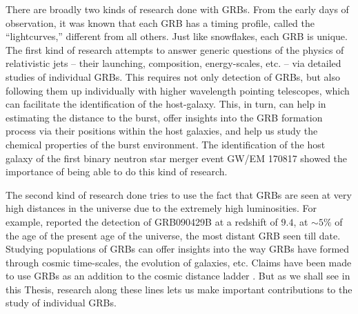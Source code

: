 There are broadly two kinds of research done with GRBs. From the early days of observation, it was known that each GRB has a timing profile, called the ``lightcurves,'' different from all others. Just like snowflakes, each GRB is unique. The first kind of research attempts to answer generic questions of the physics of relativistic jets -- their launching, composition, energy-scales, etc. -- via detailed studies of individual GRBs. This requires not only detection of GRBs, but also following them up individually with higher wavelength pointing telescopes, which can facilitate the identification of the host-galaxy. This, in turn, can help in estimating the distance to the burst, offer insights into the GRB formation process via their positions within the host galaxies, and help us study the chemical properties of the burst environment. The identification of the host galaxy of the first binary neutron star merger event GW/EM 170817 \citep{GW170817-2017, EM170817-2017} showed the importance of being able to do this kind of research.

The second kind of research done tries to use the fact that GRBs are seen at very high distances in the universe due to the extremely high luminosities. For example, \cite{Cucchiara_et_al.-2011-ApJ} reported the detection of GRB090429B at a redshift of $9.4$, at $\sim 5\%$ of the age of the present age of the universe, the most distant GRB seen till date. Studying populations of GRBs can offer insights into the way GRBs have formed through cosmic time-scales, the evolution of galaxies, etc. Claims have been made to use GRBs as an addition to the cosmic distance ladder \citep{Tan_et_al.-2013-ApJL}. But as we shall see in this Thesis, research along these lines lets us make important contributions to the study of individual GRBs.



